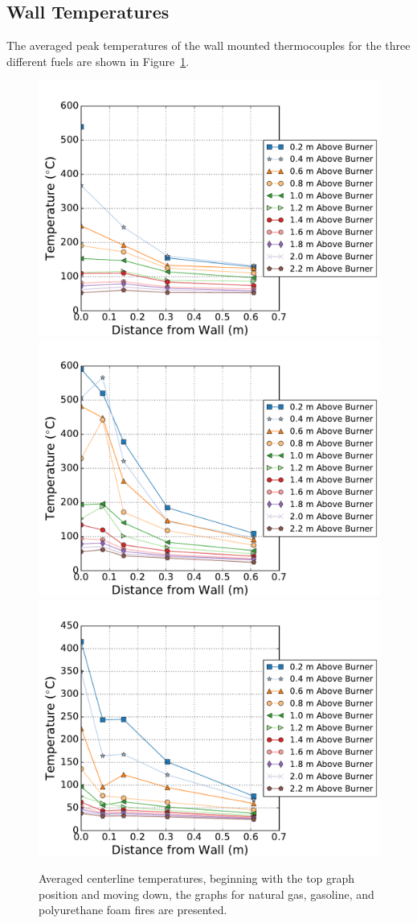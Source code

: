 \documentclass[twoside]{uocthesis}
\begin{document}
\subsection{Wall Temperatures}

The averaged peak temperatures of the wall mounted thermocouples for the three different fuels are shown in Figure~\ref{IWGB_Temp_Comp_FrontCenter}.

\begin{figure}[p]
	\centering
	\includegraphics[width=.625\columnwidth]{../Figures/IWGB_NG_TC_Surface_Center_Avg}\\
	\includegraphics[width=.625\columnwidth]{../Figures/IWGB_GAS_TC_Surface_Center_Avg}\\
	\includegraphics[width=.625\columnwidth]{../Figures/IWGB_PUF_TC_Surface_Center_Avg}\\
	\caption[Averaged centerline temperature for the natural gas, gasoline, and foam fires]{Averaged centerline temperatures, beginning with the top graph position and moving down, the graphs for natural gas, gasoline, and polyurethane foam fires are presented.}
	\label{IWGB_Temp_Comp_FrontCenter}
\end{figure}
\end{document}
